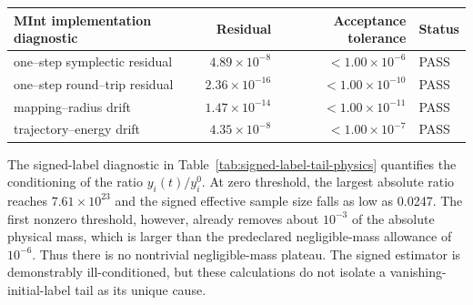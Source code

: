 \begin{center}
\small
\begin{tabular}{L{0.43\textwidth}rrl}
\toprule
MInt implementation diagnostic & Residual & Acceptance tolerance & Status \\
\midrule
one--step symplectic residual & $4.89\times10^{-8}$ & $<1.00\times10^{-6}$ & PASS \\
one--step round--trip residual & $2.36\times10^{-16}$ & $<1.00\times10^{-10}$ & PASS \\
mapping--radius drift & $1.47\times10^{-14}$ & $<1.00\times10^{-11}$ & PASS \\
trajectory--energy drift & $4.35\times10^{-8}$ & $<1.00\times10^{-7}$ & PASS \\
\bottomrule
\end{tabular}
\end{center}

The signed-label diagnostic in Table~\ref{tab:signed-label-tail-physics}
quantifies the conditioning of the ratio \(y_i(t)/y_i^0\). At zero threshold,
the largest absolute ratio reaches \(7.61\times10^{23}\) and the signed
effective sample size falls as low as 0.0247. The first nonzero threshold,
however, already removes about \(10^{-3}\) of the absolute physical mass,
which is larger than the predeclared negligible-mass allowance of \(10^{-6}\).
Thus there is no nontrivial negligible-mass plateau. The signed estimator is
demonstrably ill-conditioned, but these calculations do not isolate a
vanishing-initial-label tail as its unique cause.

